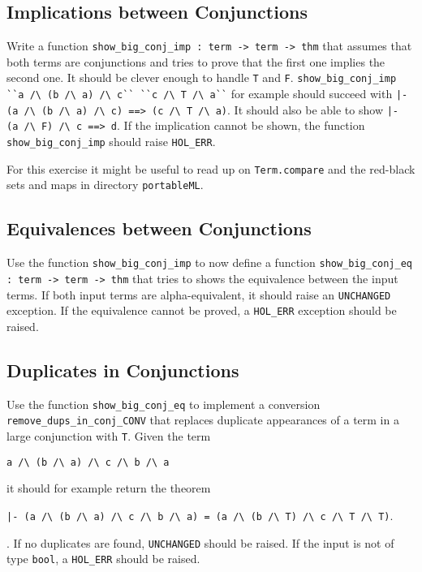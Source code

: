 \documentclass[a4paper,10pt,oneside]{scrartcl}
\begin{document}
\subsection{Implications between Conjunctions}
Write a function \texttt{show\_big\_conj\_imp :\ term -> term -> thm} that assumes that both terms are conjunctions and tries to prove that the first one implies the second one. It should be clever enough to handle \texttt{T} and \texttt{F}.
\verb#show_big_conj_imp ``a /\ (b /\ a) /\ c`` ``c /\ T /\ a``# for example should succeed with \verb#|- (a /\ (b /\ a) /\ c) ==> (c /\ T /\ a)#. It should also be able to show \verb#|- (a /\ F) /\ c ==> d#. If the implication cannot be shown, the function \texttt{show\_big\_conj\_imp} should raise \texttt{HOL\_ERR}.

For this exercise it might be useful to read up on \texttt{Term.compare} and the red-black sets and maps in directory \texttt{portableML}.



\subsection{Equivalences between Conjunctions}
Use the function \texttt{show\_big\_conj\_imp} to now define a function \texttt{show\_big\_conj\_eq :\ term -> term -> thm} that tries to shows the equivalence between the input terms. If both input terms are alpha-equivalent, it should raise an \texttt{UNCHANGED} exception. If the equivalence cannot be proved, a \texttt{HOL\_ERR} exception should be raised.

\subsection{Duplicates in Conjunctions}
Use the function \texttt{show\_big\_conj\_eq} to implement a conversion \texttt{remove\_dups\_in\_conj\_CONV} that replaces duplicate appearances of a term in a large conjunction with \texttt{T}. Given the term \begin{center}\verb#a /\ (b /\ a) /\ c /\ b /\ a#
\end{center}
it should for example return the theorem
\begin{center}
\verb#|- (a /\ (b /\ a) /\ c /\ b /\ a) = (a /\ (b /\ T) /\ c /\ T /\ T)#.
\end{center}.
If no duplicates are found, \texttt{UNCHANGED} should be raised. If the input is not of type
\texttt{bool}, a \texttt{HOL\_ERR} should be raised.
\end{document}
